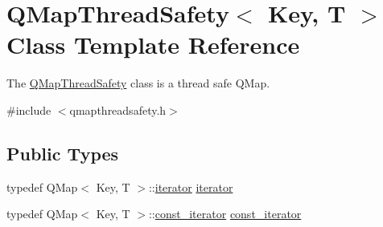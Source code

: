 \hypertarget{class_q_map_thread_safety}{}\section{Q\+Map\+Thread\+Safety$<$ Key, T $>$ Class Template Reference}
\label{class_q_map_thread_safety}


The \hyperlink{class_q_map_thread_safety}{Q\+Map\+Thread\+Safety} class is a thread safe Q\+Map.  




{\ttfamily \#include $<$qmapthreadsafety.\+h$>$}

\subsection*{Public Types}
\begin{DoxyCompactItemize}
\item 
typedef Q\+Map$<$ Key, T $>$\+::\hyperlink{class_q_map_thread_safety_a454c8af3f68e6d61aecaf1b918aa525b}{iterator} \hyperlink{class_q_map_thread_safety_a454c8af3f68e6d61aecaf1b918aa525b}{iterator}
\item 
typedef Q\+Map$<$ Key, T $>$\+::\hyperlink{class_q_map_thread_safety_aa58d8479729f72b33e305a4d0ca957bd}{const\+\_\+iterator} \hyperlink{class_q_map_thread_safety_aa58d8479729f72b33e305a4d0ca957bd}{const\+\_\+iterator}
\end{DoxyCompactItemize}
